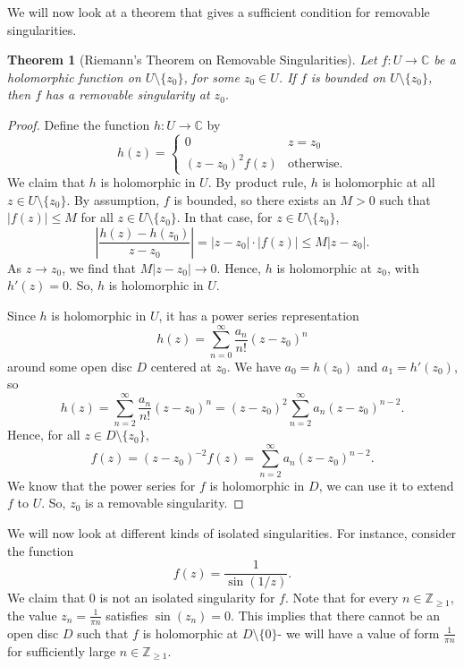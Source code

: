 \documentclass[a4paper, openany]{memoir}
\theoremstyle{definition}
\theoremstyle{plain}
\newtheorem{theorem}[definition]{Theorem}
\begin{document}
    We will now look at a theorem that gives a sufficient condition for removable singularities.
    \begin{theorem}[Riemann's Theorem on Removable Singularities]
        Let $f \colon U \to \mathbb{C}$ be a holomorphic function on $U \setminus \{z_0\}$, for some $z_0 \in U$. If $f$ is bounded on $U \setminus \{z_0\}$, then $f$ has a removable singularity at $z_0$.
    \end{theorem}
    \begin{proof}
        Define the function $h \colon U \to \mathbb{C}$ by
        \[h(z) = \begin{cases}
            0 & z = z_0 \\
            (z - z_0)^2 f(z) & \textrm{otherwise}.
        \end{cases}\]
        We claim that $h$ is holomorphic in $U$. By product rule, $h$ is holomorphic at all $z \in U \setminus \{z_0\}$. By assumption, $f$ is bounded, so there exists an $M > 0$ such that $|f(z)| \leq M$ for all $z \in U \setminus \{z_0\}$. In that case, for $z \in U \setminus \{z_0\}$,
        \[\left|\frac{h(z) - h(z_0)}{z - z_0}\right| = |z - z_0| \cdot |f(z)| \leq M|z - z_0|.\]
        As $z \to z_0$, we find that $M|z -z_0| \to 0$. Hence, $h$ is holomorphic at $z_0$, with $h'(z) = 0$. So, $h$ is holomorphic in $U$.

        Since $h$ is holomorphic in $U$, it has a power series representation
        \[h(z) = \sum_{n=0}^\infty \frac{a_n}{n!} (z - z_0)^n\]
        around some open disc $D$ centered at $z_0$. We have $a_0 = h(z_0)$ and $a_1 = h'(z_0)$, so
        \[h(z) = \sum_{n=2}^\infty \frac{a_n}{n!}(z - z_0)^n = (z - z_0)^2 \sum_{n=2}^\infty a_n(z - z_0)^{n-2}.\]
        Hence, for all $z \in D \setminus \{z_0\}$,
        \[f(z) = (z - z_0)^{-2} f(z) = \sum_{n=2}^\infty a_n (z - z_0)^{n-2}.\]
        We know that the power series for $f$ is holomorphic in $D$, we can use it to extend $f$ to $U$. So, $z_0$ is a removable singularity.
    \end{proof}
    
    We will now look at different kinds of isolated singularities. For instance, consider the function
    \[f(z) = \frac{1}{\sin (1/z)}.\]
    We claim that $0$ is not an isolated singularity for $f$. Note that for every $n \in \mathbb{Z}_{\geq 1}$, the value $z_n = \frac{1}{\pi n}$ satisfies $\sin (z_n) = 0$. This implies that there cannot be an open disc $D$ such that $f$ is holomorphic at $D \setminus \{0\}$- we will have a value of form $\frac{1}{\pi n}$ for sufficiently large $n \in \mathbb{Z}_{\geq 1}$. 
    
\end{document}
